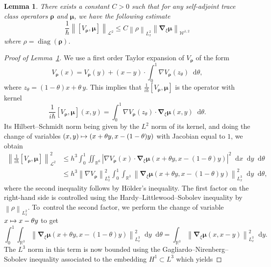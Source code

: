 \documentclass[10pt]{amsart}
\newcommand\mto{\mathchoice{\longmapsto}{\mapsto}{\mapsto}{\mapsto}}
\newtheorem{lem}{Lemma}[section]
\theoremstyle{definition}
\newcommand {\RR} {\mathbb R}
\newcommand {\Rd} {\RR^3}
\newcommand {\RRd} {\RR^6}
\renewcommand {\L} {\mathcal L}
\newcommand {\cW} {\mathcal W}
\let\lt\left
\let\rt\right
\renewcommand {\(} {\lt(}
\renewcommand {\)} {\rt)}
\newcommand {\com}[1] {\lt[{#1}\rt]}
\newcommand {\n}[1] {\lt\lvert #1 \rt\rvert}
\newcommand {\nrm}[1] {\lt\lVert #1\rt\rVert}
\newcommand {\Nrm}[2] {\nrm{#1}_{#2}}
\renewcommand {\d} {\mathop{}\!\mathrm{d}}
\DeclareMathOperator{\diag} {diag}
\newcommand {\Diag}[1] {\diag\!\( #1 \)}
\newcommand {\intd} {\int_{\Rd}}
\newcommand {\iintd} {\iint_{\RRd}}
\newcommand {\op} {\boldsymbol{\rho}}
\newcommand {\opmu} {\boldsymbol{\mu}}
\newcommand {\Dh} {\boldsymbol{\nabla}}
\newcommand {\Dhv}[1] {\Dh_{\!\xi} #1}
\begin{document}

\begin{lem}\label{lem:commutator_estimate_HS}
There exists a constant $C>0$ such that for any self-adjoint trace class operators $\op$ and $\opmu$, we have the following estimate
\begin{equation*}
\frac{1}{\hbar} \Nrm{\com{V_{\op},\opmu}}{\L^2} \leq C \Nrm{\rho}{L^2_x} \Nrm{\Dhv \opmu}{\cW^{1,2}}
\end{equation*}
where $\rho = \Diag{\op}$.
\end{lem}

\begin{proof}[Proof of Lemma~\ref{lem:commutator_estimate_HS}]
We use a first order Taylor expansion of $V_{\op}$ of the form
\begin{equation*}
V_{\op}(x) = V_{\op}(y) + \(x-y\)\cdot \int_0^1 \nabla V_{\op}(z_\theta)\d\theta,
\end{equation*}
where $z_\theta = \(1-\theta\)x+\theta\, y$. This implies that $\frac{1}{i\hbar}\com{V_{\op},\opmu}$ is the operator with kernel
\begin{equation*}
\frac{1}{i\hbar}\com{V_{\op},\opmu}(x,y) = \int_0^1 \nabla V_{\op}(z_\theta) \cdot \Dhv \opmu(x,y) \d\theta.
\end{equation*}
Its Hilbert--Schmidt norm being given by the $L^2$ norm of its kernel, and doing the change of variables $(x,y) \mto (x+\theta y, x-(1-\theta) y)$ with Jacobian equal to $1$, we obtain
\begin{align*}
\Nrm{\tfrac{1}{i\hbar}\com{V_{\op},\opmu}}{\L^2}^2 &\leq {h^3}\int_0^1\!\!\! \iintd \n{\nabla V_{\op}(x) \cdot \Dhv \opmu(x+\theta y,x-(1-\theta) y)}^2\d x\d y \d\theta
\\[-3pt]
&\leq {h^3} \Nrm{\nabla V_{\op}}{L_x^6}^2 \int_0^1\!\!\! \intd \Nrm{\Dhv \opmu(x+\theta y,x-(1-\theta) y)}{L^3_x}^2 \d y \d\theta,
\end{align*}
where the second inequality follows by Hölder's inequality. The first factor on the right-hand side is controlled using the Hardy--Littlewood--Sobolev inequality by $\Nrm{\rho}{L^2_x}$. To~control the second factor, we perform the change of variable $x\mto x-\theta y$ to get\vspace*{-3pt}
\begin{equation*}
\int_0^1\!\!\! \intd \Nrm{\Dhv \opmu(x+\theta y,x-(1-\theta) y)}{L^3_x}^2 \d y \d\theta = \intd \Nrm{\Dhv \opmu(x,x-y)}{L^3_x}^2 \d y.
\end{equation*}
The $L^3$ norm in this term is now bounded using the Gagliardo--Nirenberg--Sobolev inequality associated to the embedding $H^1\subset L^3$ which yields

\end{proof}
\end{document}
